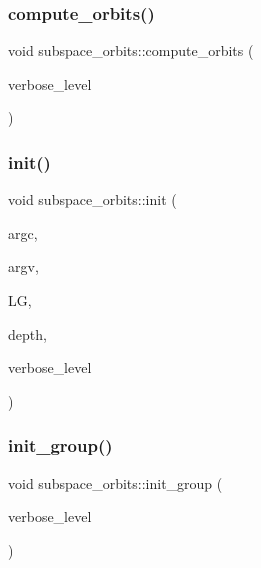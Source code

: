 \mbox{\label{classsubspace__orbits_a2778f8d49cde1675de1ef6acfe180b63}} 
\subsubsection{\texorpdfstring{compute\+\_\+orbits()}{compute\_orbits()}}
{\footnotesize\ttfamily void subspace\+\_\+orbits\+::compute\+\_\+orbits (\begin{DoxyParamCaption}\item[{\mbox{\hyperlink{galois_8h_a09fddde158a3a20bd2dcadb609de11dc}{I\+NT}}}]{verbose\+\_\+level }\end{DoxyParamCaption})}

\mbox{\label{classsubspace__orbits_ac4bc50572798a6f0bc86fb99b181b66d}} 
\subsubsection{\texorpdfstring{init()}{init()}}
{\footnotesize\ttfamily void subspace\+\_\+orbits\+::init (\begin{DoxyParamCaption}\item[{int}]{argc,  }\item[{const char $\ast$$\ast$}]{argv,  }\item[{\mbox{\hyperlink{classlinear__group}{linear\+\_\+group}} $\ast$}]{LG,  }\item[{\mbox{\hyperlink{galois_8h_a09fddde158a3a20bd2dcadb609de11dc}{I\+NT}}}]{depth,  }\item[{\mbox{\hyperlink{galois_8h_a09fddde158a3a20bd2dcadb609de11dc}{I\+NT}}}]{verbose\+\_\+level }\end{DoxyParamCaption})}

\mbox{\label{classsubspace__orbits_ad7dfe4f51cd3eea6ccfd5318e23d36c3}} 
\subsubsection{\texorpdfstring{init\+\_\+group()}{init\_group()}}
{\footnotesize\ttfamily void subspace\+\_\+orbits\+::init\+\_\+group (\begin{DoxyParamCaption}\item[{\mbox{\hyperlink{galois_8h_a09fddde158a3a20bd2dcadb609de11dc}{I\+NT}}}]{verbose\+\_\+level }\end{DoxyParamCaption})}

